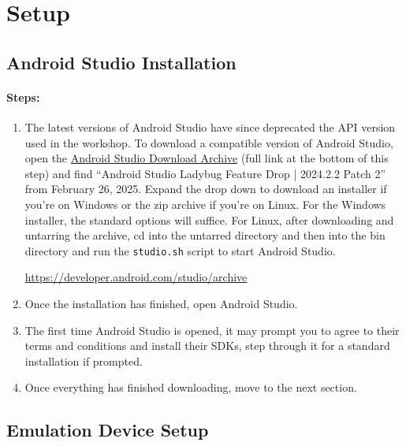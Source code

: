 \documentclass[letterpaper,12pt]{report}
\begin{document}
\clearpage
{}
\settableofcontents
\tableofcontents
\clearpage

\newpage


\section*{Setup}\label{sec:Setup}

\subsection*{Android Studio Installation}

\paragraph*{Steps:}

\begin{enumerate}
    \item The latest versions of Android Studio have since deprecated the API version used in the workshop. To download a compatible version of Android Studio, open the \href{https://developer.android.com/studio/archive}{Android Studio Download Archive} (full link at the bottom of this step) and find ``Android Studio Ladybug Feature Drop | 2024.2.2 Patch 2'' from February 26, 2025. Expand the drop down to download an installer if you're on Windows or the zip archive if you're on Linux. For the Windows installer, the standard options will suffice. For Linux, after downloading and untarring the archive, cd into the untarred directory and then into the bin directory and run the \texttt{studio.sh} script to start Android Studio.

    \url{https://developer.android.com/studio/archive}
    \item Once the installation has finished, open Android Studio.
    \item The first time Android Studio is opened, it may prompt you to agree to their terms and conditions and install their SDKs, step through it for a standard installation if prompted.
    \item Once everything has finished downloading, move to the next section.
\end{enumerate}

\subsection*{Emulation Device Setup}
\end{document}
